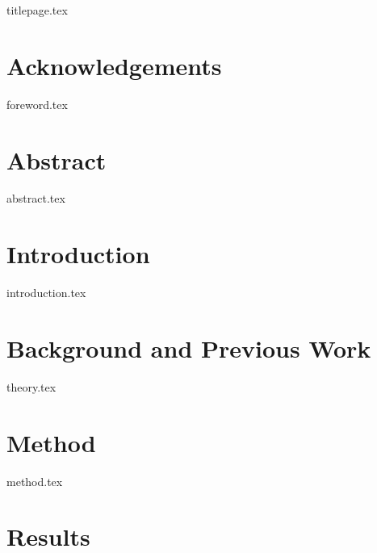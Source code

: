 \documentclass[11pt, twocolumn, a4paper]{report}
\begin{document}
{titlepage.tex}

\onecolumn
\chapter*{Acknowledgements}
{foreword.tex}

\onecolumn
\chapter*{Abstract}
{abstract.tex}

\tableofcontents
\newpage


\twocolumn
\chapter{Introduction}
{introduction.tex}


\chapter{Background and Previous Work}
{theory.tex}

\chapter{Method}
{method.tex}

\chapter{Results}
\end{document}
